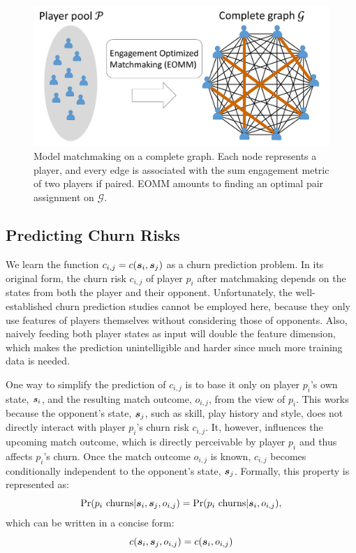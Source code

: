 \begin{figure}[tb]
\centering
\includegraphics[width=1\textwidth]{Figures/complete_matching.pdf}
\caption{Model matchmaking on a complete graph. Each node represents a player, and every edge is associated with the sum engagement metric of two players if paired. EOMM amounts to finding an optimal pair assignment on $\mathcal{G}$.}
\label{fig:matching}
\end{figure}


\subsection{Predicting Churn Risks}\label{sec:churn}
We learn the function $c_{i,j} = c(\boldsymbol{s}_i, \boldsymbol{s}_j)$ as a churn prediction problem. In its original form, the churn risk $c_{i,j}$ of player $p_i$ after matchmaking depends on the states from both the player and their opponent. Unfortunately, the well-established churn prediction studies cannot be employed here, because they only use features of players themselves without considering those of opponents. Also, naively feeding both player states as input will double the feature dimension, which makes the prediction unintelligible and harder since much more training data is needed. 

One way to simplify the prediction of $c_{i,j}$ is to base it only on player $p_i$'s own state, $\boldsymbol{s}_i$, and the resulting match outcome, $o_{i,j}$, from the view of $p_i$. This works because the opponent's state, $\boldsymbol{s}_j$, such as skill, play history and style, does not directly interact with player $p_i$'s churn risk $c_{i,j}$. It, however, influences the upcoming match outcome, which is directly perceivable by player $p_i$ and thus affects $p_i$'s churn. Once the match outcome $o_{i,j}$ is known, $c_{i,j}$ becomes conditionally independent to the opponent's state, $\boldsymbol{s}_j$. Formally, this property is represented as:
\begin{equation}\label{eqn:dependency_raw}
\Pr(p_i \text{ churns} | \boldsymbol{s}_i, \boldsymbol{s}_j, o_{i,j}) = \Pr(p_i \text{ churns} | \boldsymbol{s}_i, o_{i,j}),
\end{equation}
which can be written in a concise form:
\begin{equation}\label{eqn:dependency}
c(\boldsymbol{s}_i, \boldsymbol{s}_j, o_{i,j}) = c(\boldsymbol{s}_i, o_{i,j})
\end{equation}

